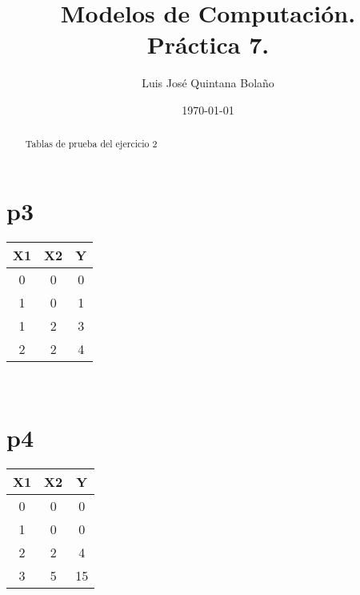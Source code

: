 \documentclass[a4paper]{article}
\title{Modelos de Computación.\\ Práctica 7. }
\author{Luis José Quintana Bolaño}
\date{\today}
\begin{document}
	\maketitle
	\begin{abstract}
	    Tablas de prueba del ejercicio 2
  	\end{abstract}
	\section{p3}
		\begin{center}
		\begin{tabular}{|c|c|c|} 
  				X1 & X2 & Y \\ \hline
  				0 & 0 & 0 \\ \hline
			    1 & 0 & 1 \\ \hline
			    1 & 2 & 3 \\ \hline
			    2 & 2 & 4 \\ \hline
  		\end{tabular} \\
  		\end{center}
  	\section{p4}
  		\begin{center}
		\begin{tabular}{|c|c|c|} 
  				X1 & X2 & Y \\ \hline
  				0 & 0 & 0 \\ \hline
			    1 & 0 & 0 \\ \hline
			    2 & 2 & 4 \\ \hline
			    3 & 5 & 15 \\ \hline
  		\end{tabular} \\
  		\end{center}
\end{document}
